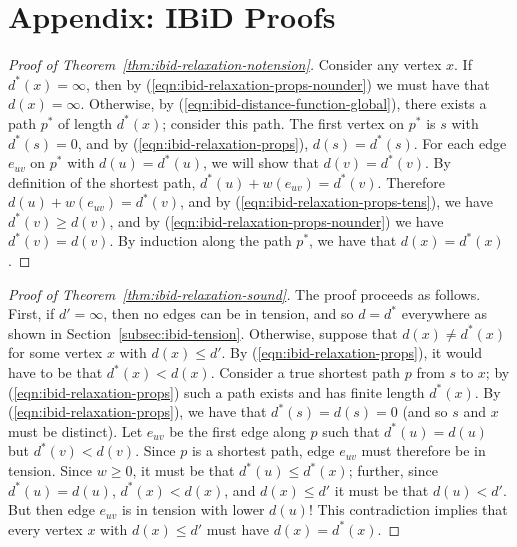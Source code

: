 \chapter{Appendix: IBiD Proofs}
\label{chap:appendix-ibid-proofs}


\begin{proof}[Proof of Theorem~\ref{thm:ibid-relaxation-notension}]
Consider any vertex $x$.
If $d^*(x) = \infty$,
then by (\ref{eqn:ibid-relaxation-props-nounder}) we must have that
$d(x) = \infty$.
Otherwise,
by (\ref{eqn:ibid-distance-function-global}),
there exists a path $p^*$ of length $d^*(x)$;
consider this path.
The first vertex on $p^*$ is $s$ with $d^*(s) = 0$,
and by (\ref{eqn:ibid-relaxation-props}),
$d(s) = d^*(s)$.
For each edge $e_{uv}$ on $p^*$ with $d(u) = d^*(u)$,
we will show that $d(v) = d^*(v)$.
By definition of the shortest path,
$d^*(u) + w(e_{uv}) = d^*(v)$.
Therefore $d(u) + w(e_{uv}) = d^*(v)$,
and by (\ref{eqn:ibid-relaxation-props-tens}),
we have $d^*(v) \geq d(v)$,
and by (\ref{eqn:ibid-relaxation-props-nounder})
we have $d^*(v) = d(v)$.
By induction along the path $p^*$,
we have that $d(x) = d^*(x)$.
\end{proof}


\begin{proof}[Proof of Theorem~\ref{thm:ibid-relaxation-sound}]
The proof proceeds as follows.
First, if $d' = \infty$,
then no edges can be in tension,
and so $d = d^*$ everywhere
as shown in Section~\ref{subsec:ibid-tension}.
Otherwise,
suppose that $d(x) \neq d^*(x)$
for some vertex $x$ with $d(x) \leq d'$.
By (\ref{eqn:ibid-relaxation-props}),
it would have to be that $d^*(x) < d(x)$.
Consider a true shortest path $p$ from $s$ to $x$;
by (\ref{eqn:ibid-relaxation-props})
such a path exists and has finite length $d^*(x)$.
By (\ref{eqn:ibid-relaxation-props}),
we have that $d^*(s) = d(s) = 0$
(and so $s$ and $x$ must be distinct).
Let $e_{uv}$ be the first edge along $p$ such that
$d^*(u) = d(u)$
but $d^*(v) < d(v)$.
Since $p$ is a shortest path,
edge $e_{uv}$ must therefore be in tension.
Since $w \geq 0$,
it must be that $d^*(u) \leq d^*(x)$;
further, since $d^*(u) = d(u)$,
$d^*(x) < d(x)$,
and $d(x) \leq d'$
it must be that $d(u) < d'$.
But then edge $e_{uv}$ is in tension with lower $d(u)$!
This contradiction implies that every vertex $x$
with $d(x) \leq d'$
must have $d(x) = d^*(x)$.
\end{proof}


